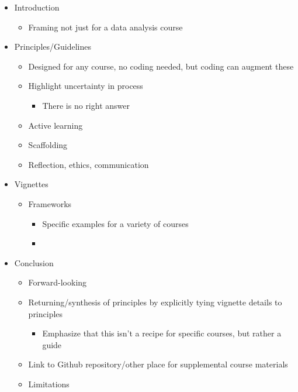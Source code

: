 \documentclass{article}
\begin{document}
\begin{itemize}
\item
  Introduction

  \begin{itemize}
  \item
    Framing not just for a data analysis course\\
  \end{itemize}
\item
  Principles/Guidelines

  \begin{itemize}
  \item
    Designed for any course, no coding needed, but coding can augment
    these\\
  \item
    Highlight uncertainty in process

    \begin{itemize}
    \item
      There is no right answer\\
    \end{itemize}
  \item
    Active learning\\
  \item
    Scaffolding\\
  \item
    Reflection, ethics, communication\\
  \end{itemize}
\item
  Vignettes

  \begin{itemize}
  \item
    Frameworks

    \begin{itemize}
    \item
      Specific examples for a variety of courses\\
    \item
    \end{itemize}
  \end{itemize}
\item
  Conclusion

  \begin{itemize}
  \item
    Forward-looking\\
  \item
    Returning/synthesis of principles by explicitly tying vignette
    details to principles

    \begin{itemize}
    \item
      Emphasize that this isn't a recipe for specific courses, but
      rather a guide\\
    \end{itemize}
  \item
    Link to Github repository/other place for supplemental course
    materials\\
  \item
    Limitations


\end{itemize}
\end{itemize}
\end{document}
